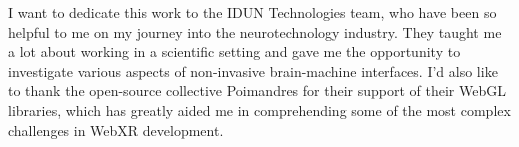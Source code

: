 \begin{dedication}

	I want to dedicate this work to the IDUN Technologies team, who have been so helpful to me on my journey into the neurotechnology industry. They taught me a lot about working in a scientific setting and gave me the opportunity to investigate various aspects of non-invasive brain-machine interfaces. I'd also like to thank the open-source collective Poimandres for their support of their WebGL libraries, which has greatly aided me in comprehending some of the most complex challenges in WebXR development.

\end{dedication}